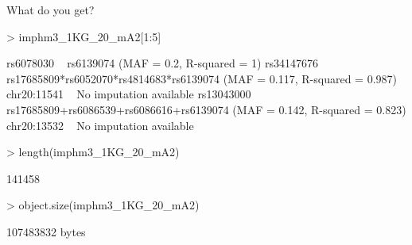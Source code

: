 \clearpage

{\huge What do you get?}

\begin{Schunk}
\begin{Sinput}
> imphm3_1KG_20_mA2[1:5]
\end{Sinput}
\begin{Soutput}
rs6078030  ~  rs6139074 (MAF = 0.2, R-squared = 1)
rs34147676  ~  rs17685809*rs6052070*rs4814683*rs6139074 (MAF = 0.117, 
                   R-squared = 0.987)
chr20:11541 ~ No imputation available
rs13043000  ~  rs17685809+rs6086539+rs6086616+rs6139074 (MAF = 0.142, 
                   R-squared = 0.823)
chr20:13532 ~ No imputation available
\end{Soutput}
\begin{Sinput}
> length(imphm3_1KG_20_mA2)
\end{Sinput}
\begin{Soutput}
[1] 141458
\end{Soutput}
\begin{Sinput}
> object.size(imphm3_1KG_20_mA2)
\end{Sinput}
\begin{Soutput}
107483832 bytes
\end{Soutput}
\end{Schunk}

\clearpage

